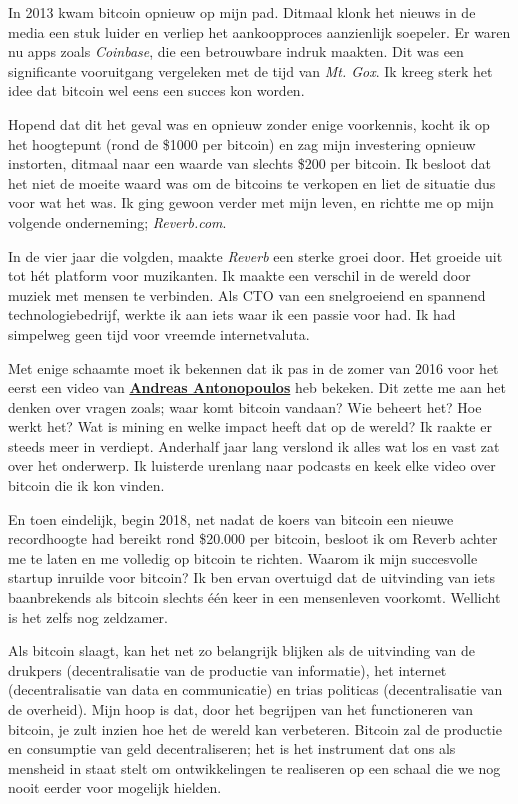 In 2013 kwam bitcoin opnieuw op mijn pad. Ditmaal klonk het nieuws in de media een stuk luider en verliep het aankoopproces aanzienlijk soepeler. Er waren nu apps zoals \textit{Coinbase}, die een betrouwbare indruk maakten. Dit was een significante vooruitgang vergeleken met de tijd van \textit{Mt. Gox}. Ik kreeg sterk het idee dat bitcoin wel eens een succes kon worden.

Hopend dat dit het geval was en opnieuw zonder enige voorkennis, kocht ik op het hoogtepunt (rond de \$1000 per bitcoin) en zag mijn investering opnieuw instorten, ditmaal naar een waarde van slechts \$200 per bitcoin. Ik besloot dat het niet de moeite waard was om de bitcoins te verkopen en liet de situatie dus voor wat het was. Ik ging gewoon verder met mijn leven, en richtte me op mijn volgende onderneming; \textit{Reverb.com}.

In de vier jaar die volgden, maakte \textit{Reverb} een sterke groei door. Het groeide uit tot hét platform voor muzikanten. Ik maakte een verschil in de wereld door muziek met mensen te verbinden. Als CTO van een snelgroeiend en spannend technologiebedrijf, werkte ik aan iets waar ik een passie voor had. Ik had simpelweg geen tijd voor vreemde internetvaluta.

Met enige schaamte moet ik bekennen dat ik pas in de zomer van 2016 voor het eerst een video van \href{https://www.youtube.com/channel/UCJWCJCWOxBYSi5DhCieLOLQ}{\textbf{Andreas Antonopoulos}} heb bekeken. Dit zette me aan het denken over vragen zoals; waar komt bitcoin vandaan? Wie beheert het? Hoe werkt het? Wat is mining en welke impact heeft dat op de wereld? Ik raakte er steeds meer in verdiept. Anderhalf jaar lang verslond ik alles wat los en vast zat over het onderwerp. Ik luisterde urenlang naar podcasts en keek elke video over bitcoin die ik kon vinden.

En toen eindelijk, begin 2018, net nadat de koers van bitcoin een nieuwe recordhoogte had bereikt rond \$20.000 per bitcoin, besloot ik om Reverb achter me te laten en me volledig op bitcoin te richten. Waarom ik mijn succesvolle startup inruilde voor bitcoin? Ik ben ervan overtuigd dat de uitvinding van iets baanbrekends als bitcoin slechts één keer in een mensenleven voorkomt. Wellicht is het zelfs nog zeldzamer.

Als bitcoin slaagt, kan het net zo belangrijk blijken als de uitvinding van de drukpers (decentralisatie van de productie van informatie), het internet (decentralisatie van data en communicatie) en trias politicas (decentralisatie van de overheid). Mijn hoop is dat, door het begrijpen van het functioneren van bitcoin, je zult inzien hoe het de wereld kan verbeteren. Bitcoin zal de productie en consumptie van geld decentraliseren; het is het instrument dat ons als mensheid in staat stelt om ontwikkelingen te realiseren op een schaal die we nog nooit eerder voor mogelijk hielden.

